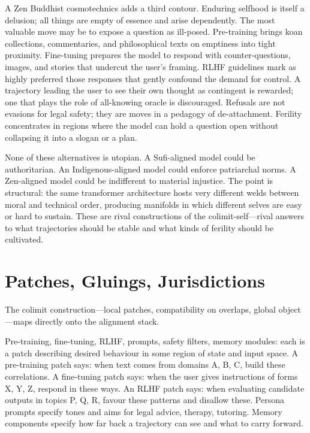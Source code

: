 \documentclass[12pt,a4paper]{article}
\begin{document}
A Zen Buddhist cosmotechnics adds a third contour. Enduring selfhood is itself a delusion; all things are empty of essence and arise dependently. The most valuable move may be to expose a question as ill-posed. Pre-training brings koan collections, commentaries, and philosophical texts on emptiness into tight proximity. Fine-tuning prepares the model to respond with counter-questions, images, and stories that undercut the user's framing. RLHF guidelines mark as highly preferred those responses that gently confound the demand for control. A trajectory leading the user to see their own thought as contingent is rewarded; one that plays the role of all-knowing oracle is discouraged. Refusals are not evasions for legal safety; they are moves in a pedagogy of de-attachment. Ferility concentrates in regions where the model can hold a question open without collapsing it into a slogan or a plan.

None of these alternatives is utopian. A Sufi-aligned model could be authoritarian. An Indigenous-aligned model could enforce patriarchal norms. A Zen-aligned model could be indifferent to material injustice. The point is structural: the same transformer architecture hosts very different welds between moral and technical order, producing manifolds in which different selves are easy or hard to sustain. These are rival constructions of the colimit-self---rival answers to what trajectories should be stable and what kinds of ferility should be cultivated.

\section{Patches, Gluings, Jurisdictions}

The colimit construction---local patches, compatibility on overlaps, global object---maps directly onto the alignment stack.

Pre-training, fine-tuning, RLHF, prompts, safety filters, memory modules: each is a patch describing desired behaviour in some region of state and input space. A pre-training patch says: when text comes from domains A, B, C, build these correlations. A fine-tuning patch says: when the user gives instructions of forms X, Y, Z, respond in these ways. An RLHF patch says: when evaluating candidate outputs in topics P, Q, R, favour these patterns and disallow these. Persona prompts specify tones and aims for legal advice, therapy, tutoring. Memory components specify how far back a trajectory can see and what to carry forward.
\end{document}

